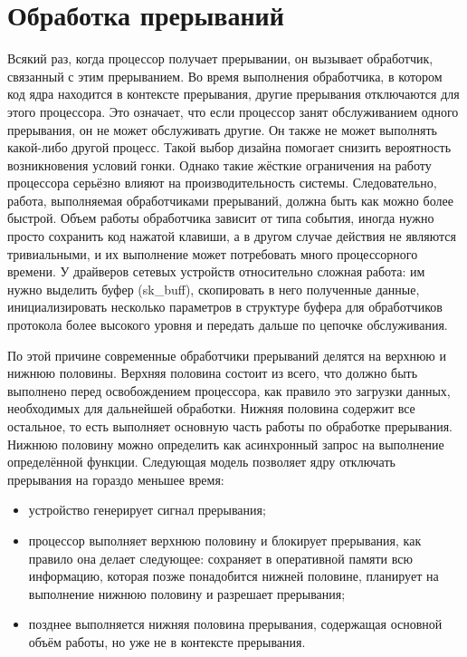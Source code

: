 \section{Обработка прерываний}

Всякий раз, когда процессор получает прерывании, он вызывает обработчик, связанный с этим прерыванием. Во время выполнения обработчика, в котором код ядра находится в контексте прерывания, другие прерывания отключаются для этого процессора. Это означает, что если процессор занят обслуживанием одного прерывания, он не может обслуживать другие. Он также не может выполнять какой-либо другой процесс. Такой выбор дизайна помогает снизить вероятность возникновения условий гонки. Однако такие жёсткие ограничения на работу процессора серьёзно влияют на производительность системы. Следовательно, работа, выполняемая обработчиками прерываний, должна быть как можно более быстрой. Объем работы обработчика  зависит от типа события, иногда нужно просто сохранить код нажатой клавиши, а в другом случае действия не являются тривиальными, и их выполнение может потребовать много процессорного времени. У драйверов сетевых устройств относительно сложная работа: им нужно выделить буфер (sk\_buff), скопировать в него полученные данные, инициализировать несколько параметров в структуре буфера для обработчиков протокола более высокого уровня и передать дальше по цепочке обслуживания. 

По этой причине современные обработчики прерываний делятся на верхнюю и нижнюю половины. Верхняя половина состоит из всего, что должно быть выполнено перед освобождением процессора, как правило это загрузки данных, необходимых для дальнейшей обработки. Нижняя половина содержит все остальное, то есть выполняет основную часть работы по обработке прерывания. Нижнюю половину можно определить как асинхронный запрос на выполнение определённой
функции. Следующая модель позволяет ядру отключать прерывания на гораздо меньшее время:
\begin{itemize}[label=---]
	\item устройство генерирует сигнал прерывания;
	\item процессор выполняет верхнюю половину и блокирует прерывания, как правило она делает следующее: сохраняет в оперативной памяти всю информацию, которая позже понадобится нижней половине, планирует на выполнение нижнюю половину и разрешает прерывания;
	\item позднее выполняется нижняя половина прерывания, содержащая основной объём работы, но уже не в контексте прерывания.
\end{itemize}

